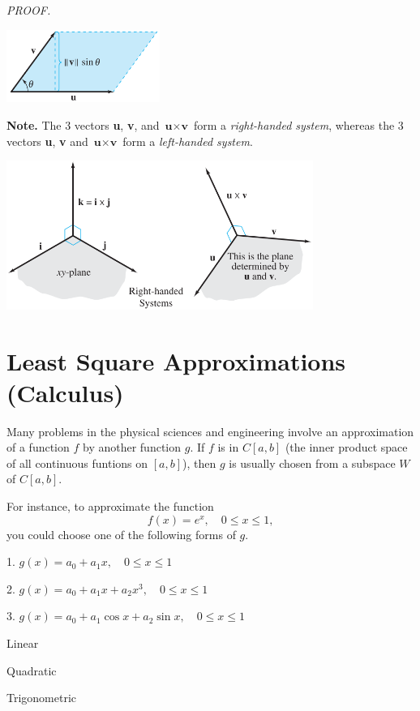 \documentclass{article}
\newcommand\B{\textbf}
\begin{document}
        \begin{minipage}{0.15\linewidth}
            \textit{ \textcolor{blue5}{PROOF.} }        
        \end{minipage}
        \begin{minipage}{0.5\linewidth}
            \includegraphics[width = 5cm] {images/uvsin.png}
        \end{minipage}

        \textbf{Note.} The 3 vectors \textbf{u}, \textbf{v}, and $\B{u} \times \B{v}$ form a \textit{right-handed system}, whereas the 3 vectors
        \textbf{u}, \textbf{v} and $\B{u} \times \B{v}$ form a \textit{left-handed system}.
        \begin{center}
            \includegraphics[width = 10cm]{images/righthanded.png}
        \end{center}
    
    \section{Least Square Approximations (Calculus)}
    Many problems in the physical sciences and engineering involve an approximation of a function $f$ by another function $g$.
    If $f$ is in $C[a,b]$ (the inner product space of all continuous funtions on $[a,b]$), then $g$ is usually chosen from a
    subspace $W$ of $C[a,b]$.

    For instance, to approximate the function 
    \[f(x) = e^x, \quad 0 \le x \le 1,\]
    you could choose one of the following forms of $g$.

    \begin{minipage}{0.5\linewidth}
            1. $g(x) = a_0 + a_1x, \quad 0 \le x \le 1$

            2. $g(x) = a_0 + a_1x + a_2x^3, \quad 0 \le x \le 1$

            3. $g(x) = a_0 + a_1\cos{x} + a_2\sin{x}, \quad 0 \le x \le 1$
    \end{minipage}
    \begin{minipage}{0.3\linewidth}
        \linespread{2.0}
            {\footnotesize \textcolor{blue5}{Linear}}

            {\footnotesize \textcolor{blue5}{Quadratic}}

            {\footnotesize \textcolor{blue5}{Trigonometric}}
    \end{minipage}
\end{document}
